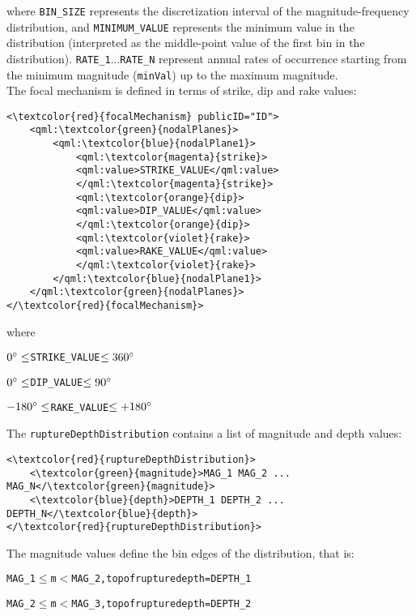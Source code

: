 where \Verb+BIN_SIZE+ represents the discretization interval of the magnitude-frequency distribution, and \Verb+MINIMUM_VALUE+ represents the minimum value in the distribution (interpreted as the middle-point value of the first bin in the distribution). \Verb+RATE_1+...\Verb+RATE_N+ represent annual rates of occurrence starting from the minimum magnitude (\Verb+minVal+) up to the maximum magnitude.\\
The focal mechanism is defined in terms of strike, dip and rake values:
\begin{Verbatim}[frame=single, commandchars=\\\{\},fontsize=\normalsize, samepage=true]
<\textcolor{red}{focalMechanism} publicID="ID">
	<qml:\textcolor{green}{nodalPlanes}>
		<qml:\textcolor{blue}{nodalPlane1}>
			<qml:\textcolor{magenta}{strike}>
			<qml:value>STRIKE_VALUE</qml:value>
			</qml:\textcolor{magenta}{strike}>
			<qml:\textcolor{orange}{dip}>
			<qml:value>DIP_VALUE</qml:value>
			</qml:\textcolor{orange}{dip}>
			<qml:\textcolor{violet}{rake}>
			<qml:value>RAKE_VALUE</qml:value>
			</qml:\textcolor{violet}{rake}>
		</qml:\textcolor{blue}{nodalPlane1}>
	</qml:\textcolor{green}{nodalPlanes}>
</\textcolor{red}{focalMechanism}>
 \end{Verbatim}
where
\begin{alltt} \(0\degree \leq\) STRIKE_VALUE \(\leq 360\degree\) \end{alltt}
\begin{alltt} \(0\degree \leq\) DIP_VALUE \(\leq 90\degree\) \end{alltt}
\begin{alltt} \(-180\degree \leq\) RAKE_VALUE \(\leq +180\degree\) \end{alltt}
The \Verb+ruptureDepthDistribution+ contains a list of magnitude and depth values:
\begin{Verbatim}[frame=single, commandchars=\\\{\},fontsize=\normalsize, samepage=true]
<\textcolor{red}{ruptureDepthDistribution}>
	<\textcolor{green}{magnitude}>MAG_1 MAG_2 ... MAG_N</\textcolor{green}{magnitude}>
	<\textcolor{blue}{depth}>DEPTH_1 DEPTH_2 ... DEPTH_N</\textcolor{blue}{depth}>
</\textcolor{red}{ruptureDepthDistribution}>
\end{Verbatim}
The magnitude values define the bin edges of the distribution, that is:
\begin{alltt}MAG_1 \(\leq\) m \(<\) MAG_2, top of rupture depth = DEPTH_1 \end{alltt}
\begin{alltt}MAG_2 \(\leq\) m \(<\) MAG_3, top of rupture depth = DEPTH_2 \end{alltt}
